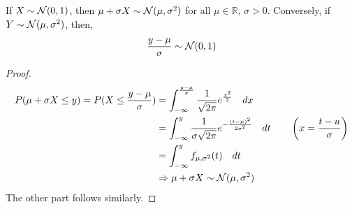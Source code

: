 \begin{theorem}
If $X \sim \mathcal{N}(0, 1)$, then $\mu + \sigma X \sim
\mathcal{N}(\mu, \sigma^2)$ for all $\mu \in \mathbb{R}$, $\sigma > 0$.
Conversely, if $Y \sim \mathcal{N}(\mu, \sigma^2)$, then,
\[
    \frac{y - \mu}{\sigma} \sim \mathcal{N}(0, 1)
\]
\end{theorem}
\begin{proof}\quad                                                           \\
\begin{align*}
      P(\mu + \sigma X \leq y) = P(X \leq \frac{y - \mu}{\sigma})
   &= \int_{-\infty}^{\frac{y - \mu}{\sigma}}
          \frac{1}{\sqrt{2\pi}} e^{\frac{x^2}{2}}
      \quad dx                                                               \\
   &= \int_{-\infty}^{y} 
          \frac{1}{\sigma \sqrt{2 \pi}} e^{-\frac{(t - \mu)^2}{2\sigma^2}}
      \quad dt
      \qquad \left( x = \frac{t - u}{\sigma} \right)                         \\
   &= \int_{-\infty}^{y}
          f_{\mu, \sigma^2}(t)
      \quad dt                                                               \\
   &\Rightarrow \mu + \sigma X \sim \mathcal{N}(\mu, \sigma^2)
\end{align*}
The other part follows similarly.
\end{proof}

